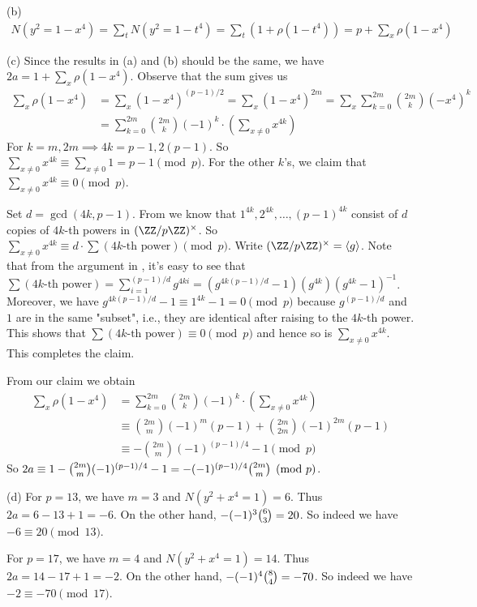 \documentclass[../Chapter.tex]{subfiles}
\begin{document}
(b) \begin{align*}
N(y^2=1-x^4) = \sum_t N(y^2=1-t^4) = \sum _t (1+\rho(1-t^4)) = p+\sum_x \rho(1-x^4)
\end{align*}

(c) Since the results in (a) and (b) should be the same, we have $2a=1+\sum_x \rho(1-x^4)$. Observe that the sum gives us
\begin{align*}
\sum_x \rho(1-x^4) &= \sum_x (1-x^4)^{(p-1)/2} = \sum_x (1-x^4)^{2m} = \sum_x \sum_{k=0}^{2m} \binom{2m}{k}(-x^4)^k \\
&= \sum_{k=0}^{2m}\binom{2m}{k}(-1)^k\cdot\left(\sum_{x\neq0} x^{4k}\right)
\end{align*}
For $k=m,2m\implies 4k=p-1,2(p-1)$. So $\sum_{x\neq0} x^{4k}\equiv\sum_{x\neq0} 1 = p-1 \pmod{p}$. For the other $k$'s, we claim that $\sum_{x\neq0} x^{4k}\equiv0\pmod{p}$.

Set $d=\gcd(4k,p-1)$. From  we know that $1^{4k},2^{4k},\ldots,(p-1)^{4k}$ consist of $d$ copies of $4k$-th powers in $(\ZZ/p\ZZ)^\times$. So $\sum_{x\neq0} x^{4k}\equiv d\cdot\sum (4k\text{-th power}) \pmod{p}$. Write $(\ZZ/p\ZZ)^\times=\langle g\rangle$. Note that from the argument in , it's easy to see that $\sum (4k\text{-th power}) = \sum_{i=1}^{(p-1)/d} g^{4ki} = (g^{4k(p-1)/d}-1)(g^{4k})(g^{4k}-1)^{-1}$. Moreover, we have $g^{4k(p-1)/d}-1\equiv 1^{4k}-1=0\pmod{p}$ because $g^{(p-1)/d}$ and $1$ are in the same "subset", i.e., they are identical after raising to the $4k$-th power. This shows that $\sum (4k\text{-th power}) \equiv0\pmod{p}$ and hence so is $\sum_{x\neq0} x^{4k}$. This completes the claim.

From our claim we obtain
\begin{align*}
\sum_x \rho(1-x^4) &= \sum_{k=0}^{2m}\binom{2m}{k}(-1)^k\cdot\left(\sum_{x\neq0} x^{4k}\right) \\
&\equiv \binom{2m}{m}(-1)^{m}(p-1)+\binom{2m}{2m}(-1)^{2m}(p-1) \\
&\equiv -\binom{2m}{m}(-1)^{(p-1)/4} - 1 \pmod{p}
\end{align*}
So $2a\equiv 1-\tbinom{2m}{m}(-1)^{(p-1)/4}-1 = -(-1)^{(p-1)/4}\tbinom{2m}{m} \pmod{p}$.

(d) For $p=13$, we have $m=3$ and $N(y^2+x^4=1)=6$. Thus $2a=6-13+1=-6$. On the other hand, $-(-1)^3\tbinom{6}{3}=20$. So indeed we have $-6\equiv20\pmod{13}$.

For $p=17$, we have $m=4$ and $N(y^2+x^4=1)=14$. Thus $2a=14-17+1=-2$. On the other hand, $-(-1)^4\tbinom{8}{4}=-70$. So indeed we have $-2\equiv-70\pmod{17}$.
\end{document}
